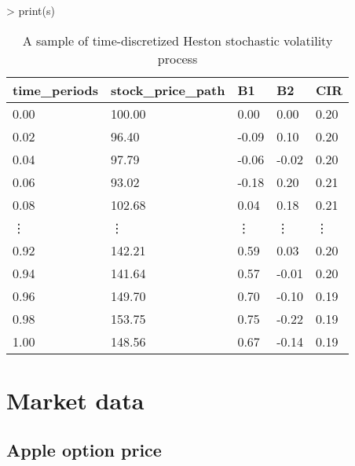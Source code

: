 \documentclass[12pt]{report}
\begin{document}
\begin{appendices}
\begin{Schunk}
\begin{Sinput}
> print(s)
\end{Sinput}
\end{Schunk}

\begin{table}[H]
\centering
\begin{tabular}{lllll}
  \hline
 time\_periods & stock\_price\_path & B1 & B2 & CIR \\ 
  \hline
  0.00 & 100.00 & 0.00 & 0.00 & 0.20 \\ 
  0.02 & 96.40 & -0.09 & 0.10 & 0.20 \\ 
  0.04 & 97.79 & -0.06 & -0.02 & 0.20 \\ 
  0.06 & 93.02 & -0.18 & 0.20 & 0.21 \\ 
  0.08 & 102.68 & 0.04 & 0.18 & 0.21 \\ 
  \vdots &\vdots &\vdots &\vdots &\vdots\\
  0.92 & 142.21 & 0.59 & 0.03 & 0.20 \\ 
  0.94 & 141.64 & 0.57 & -0.01 & 0.20 \\ 
  0.96 & 149.70 & 0.70 & -0.10 & 0.19 \\ 
  0.98 & 153.75 & 0.75 & -0.22 & 0.19 \\ 
  1.00 & 148.56 & 0.67 & -0.14 & 0.19 \\ 
   \hline
\end{tabular}
\caption{A sample of time-discretized Heston stochastic volatility process}
\end{table}




\chapter{Market data}
\label{cha:appendix:market}

\section{Apple option price}


\end{appendices}
\end{document}
